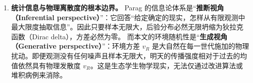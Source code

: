 \begin{enumerate}[label=\textbf{结论 \arabic*：}]
  \item \textbf{统计信息与物理离散度的根本边界。}
  Parag 的信息论体系是“\textbf{推断视角（Inferential perspective）}”：它回答“给定确定的现实，怎样从有限观测中最大限度抽取信息”。因此只要样本无限大，后验分布必然无限坍缩为狄拉克函数（Dirac delta），方差必然为零。
  而本文的环境随机性是“\textbf{生成视角（Generative perspective）}”：环境方差 $v_R$ 是大自然在每一世代施加的物理扰动。即便观测没有任何噪声且样本无限大，明天的传播强度相对于过去的均值依然具有物理发散度 $v_R$。这是生态学生物学现实，无法仅通过改进算法或堆积病例来消除。
\end{enumerate}
